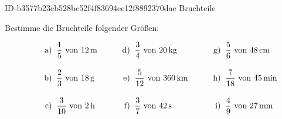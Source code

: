 \begin{exercise}
      {ID-b3577b23eb528bc52f4f83694ee12f8892370dae}
      {Bruchteile}
  \ifproblem\problem\par
    Bestimme die Bruchteile folgender Größen:
    \newcommand{\no}[1]
    {%
      \vphantom{\Bigg(}%
      \makebox[3em][r]%
      {%
        #1)%
      }%
      \;\;&%
    }%
    \begin{align*}
      \no{a} \frac{1}{5}\text{ von 12\,m} & \no{d} \frac{3}{4}\text{ von 20\,kg}   & \no{g} \frac{5}{6}\text{ von 48\,cm}   \\
      \no{b} \frac{2}{3}\text{ von 18\,g} & \no{e} \frac{5}{12}\text{ von 360\,km} & \no{h} \frac{7}{18}\text{ von 45\,min} \\
      \no{c} \frac{3}{10}\text{ von 2\,h} & \no{f} \frac{3}{7}\text{ von 42\,s}    & \no{i} \frac{4}{9}\text{ von 27\,mm}
    \end{align*}
  \fi
\end{exercise}
